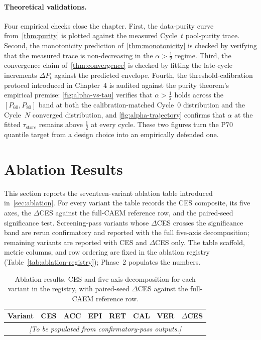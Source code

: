 \paragraph{Theoretical validations.} Four empirical checks close the
chapter. First, the data-purity curve from~\cref{thm:purity} is plotted
against the measured Cycle~$t$ pool-purity trace. Second, the
monotonicity prediction of~\cref{thm:monotonicity} is checked by
verifying that the measured trace is non-decreasing in the
$\alpha > \tfrac{1}{2}$ regime. Third, the convergence claim
of~\cref{thm:convergence} is checked by fitting the late-cycle
increments $\Delta P_t$ against the predicted envelope. Fourth, the
threshold-calibration protocol introduced in Chapter~4 is audited
against the purity theorem's empirical premise: \cref{fig:alpha-vs-tau}
verifies that $\alpha > \tfrac{1}{2}$ holds across the
$[P_{60}, P_{80}]$ band at both the calibration-matched Cycle~0
distribution and the Cycle~$N$ converged distribution, and
\cref{fig:alpha-trajectory} confirms that $\alpha$ at the fitted
$\tau_{\text{store}}$ remains above $\tfrac{1}{2}$ at every cycle.
These two figures turn the P70 quantile target from a design choice
into an empirically defended one.

\section{Ablation Results}
\label{sec:ablation-results}

This section reports the seventeen-variant ablation table introduced
in~\cref{sec:ablation}. For every variant the table records the CES
composite, its five axes, the $\Delta$CES against the full-CAEM
reference row, and the paired-seed significance test. Screening-pass
variants whose $\Delta$CES crosses the significance band are rerun
confirmatory and reported with the full five-axis decomposition;
remaining variants are reported with CES and $\Delta$CES only. The
table scaffold, metric columns, and row ordering are fixed in the
ablation registry (Table~\ref{tab:ablation-registry}); Phase~2
populates the numbers.

\begin{table}[t]
\centering
\caption{Ablation results. CES and five-axis decomposition for each
variant in the registry, with paired-seed $\Delta$CES against the
full-CAEM reference row.}
\label{tab:ablation-main}
\begin{tabular}{lrrrrrrr}
\toprule
Variant & CES & ACC & EPI & RET & CAL & VER & $\Delta$CES \\
\midrule
\multicolumn{8}{c}{\emph{[To be populated from confirmatory-pass outputs.]}}\\
\bottomrule
\end{tabular}
\end{table}

